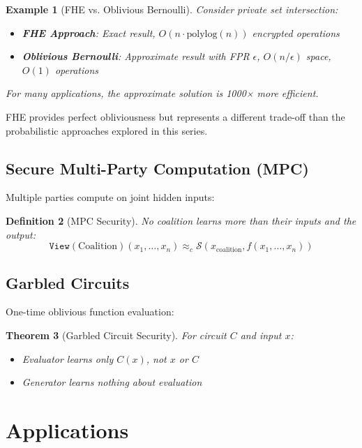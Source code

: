 \documentclass[11pt,final]{article}
\newtheorem{theorem}{Theorem}[section]
\newtheorem{definition}[theorem]{Definition}
\newtheorem{example}[theorem]{Example}
\newcommand{\Simulator}{\mathcal{S}}
\newcommand{\View}[1]{\mathtt{View}(#1)}
\begin{document}
\begin{example}[FHE vs. Oblivious Bernoulli]
Consider private set intersection:
\begin{itemize}
    \item \textbf{FHE Approach}: Exact result, $O(n \cdot \text{polylog}(n))$ encrypted operations
    \item \textbf{Oblivious Bernoulli}: Approximate result with FPR $\epsilon$, $O(n/\epsilon)$ space, $O(1)$ operations
\end{itemize}
For many applications, the approximate solution is 1000× more efficient.
\end{example}

FHE provides perfect obliviousness but represents a different trade-off than the probabilistic approaches explored in this series.

\subsection{Secure Multi-Party Computation (MPC)}

Multiple parties compute on joint hidden inputs:

\begin{definition}[MPC Security]
No coalition learns more than their inputs and the output:
\begin{equation}
\View{\text{Coalition}}(x_1, \ldots, x_n) \approx_c \Simulator(x_{\text{coalition}}, f(x_1, \ldots, x_n))
\end{equation}
\end{definition}

\subsection{Garbled Circuits}

One-time oblivious function evaluation:

\begin{theorem}[Garbled Circuit Security]
For circuit $C$ and input $x$:
\begin{itemize}
    \item Evaluator learns only $C(x)$, not $x$ or $C$
    \item Generator learns nothing about evaluation
\end{itemize}
\end{theorem}

\section{Applications}
\end{document}
